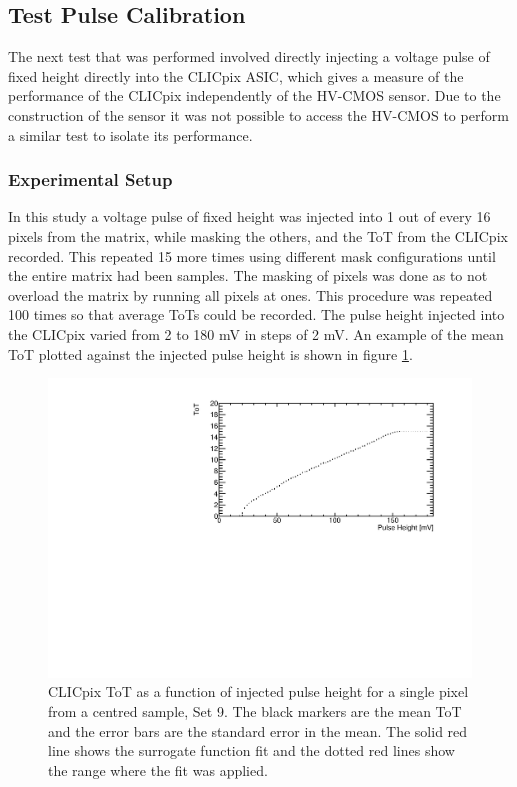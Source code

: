 
\subsection{Test Pulse Calibration}
The next test that was performed involved directly injecting a voltage pulse of fixed height directly into the CLICpix ASIC, which gives a measure of the performance of the CLICpix independently of the HV-CMOS sensor.  Due to the construction of the sensor it was not possible to access the HV-CMOS to perform a similar test to isolate its performance.  


\subsubsection{Experimental Setup}
In this study a voltage pulse of fixed height was injected into 1 out of every 16 pixels from the matrix, while masking the others, and the ToT from the CLICpix recorded.  This repeated 15 more times using different mask configurations until the entire matrix had been samples.  The masking of pixels was done as to not overload the matrix by running all pixels at ones.  This procedure was repeated 100 times so that average ToTs could be recorded.  The pulse height injected into the CLICpix varied from 2 to 180 mV in steps of 2 mV.  An example of the mean ToT plotted against the injected pulse height is shown in figure \ref{fig:testpulseexamplenofit}.  

\begin{figure}
\centering
\includegraphics[width=1.0\textwidth]{CLICdpVertex/Plots/TestPulseCalibration/Fits/Set9/ToT_PulseHeight_Set_9_ChipID_001ec0db94b1_Pixel_x0_y0_NoFit.pdf}
\caption[CLICpix ToT as a function of injected pulse height.]{CLICpix ToT as a function of injected pulse height for a single pixel from a centred sample, Set 9.  The black markers are the mean ToT and the error bars are the standard error in the mean.  The solid red line shows the surrogate function fit and the dotted red lines show the range where the fit was applied.}
\label{fig:testpulseexamplenofit}
\end{figure}

